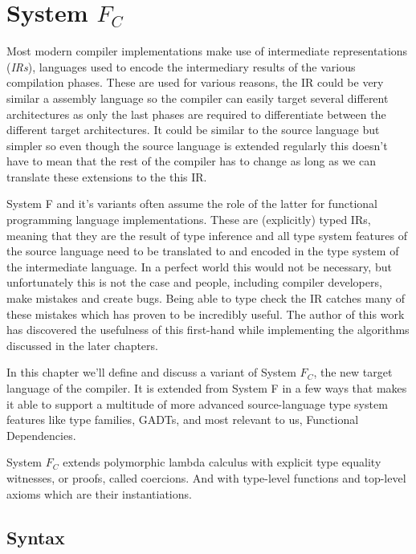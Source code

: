 \chapter{System $F_C$}
\label{cha:system-fc}

Most modern compiler implementations make use of intermediate representations
(\textit{IRs}), languages used to encode the intermediary results of the
various compilation phases. These are used for various reasons, the IR could be
very similar a assembly language so the compiler can easily target several
different architectures as only the last phases are required to differentiate
between the different target architectures. It could be similar to the source
language but simpler so even though the source language is extended regularly
this doesn't have to mean that the rest of the compiler has to change as long as
we can translate these extensions to the this IR.

System F and it's variants often assume the role of the latter for functional
programming language implementations. These are (explicitly) typed IRs, meaning
that they are the result of type inference and all type system features of the
source language need to be translated to and encoded in the type system of the
intermediate language. In a perfect world this would not be necessary, but
unfortunately this is not the case and people, including compiler developers,
make mistakes and create bugs. Being able to type check the IR catches many of
these mistakes which has proven to be incredibly useful. The author of this work
has discovered the usefulness of this first-hand while implementing the
algorithms discussed in the later chapters.

In this chapter we'll define and discuss a variant of System $F_C$, the new
target language of the compiler. It is extended from System F in a few ways that
makes it able to support a multitude of more advanced source-language type
system features like type families, GADTs, and most relevant to us, Functional
Dependencies.

System $F_C$ extends polymorphic lambda calculus with explicit type equality
witnesses, or proofs, called coercions. And with type-level functions and
top-level axioms which are their instantiations.

\section{Syntax}


